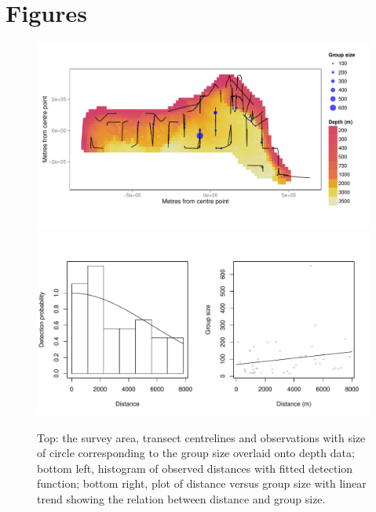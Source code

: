\documentclass[a4paper,12pt]{article}
\begin{document}
\newpage


\section*{Figures}

\begin{figure}[h!]
  \caption{Top: the survey area, transect centrelines and observations with size of circle corresponding to the group size overlaid onto depth data; bottom left, histogram of observed distances with fitted detection function; bottom right, plot of distance versus group size with linear trend showing the relation between distance and group size.}
  \label{dolphin-eda}
  \begin{center}
    \includegraphics[width=\textwidth]{figs/depth-transects}\\
        \includegraphics[width=\textwidth]{figs/distances-groups}
  \end{center}
\end{figure}

\newpage
\end{document}
